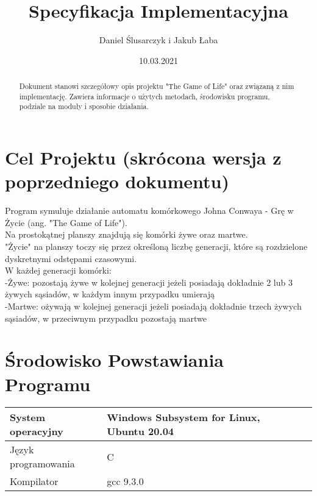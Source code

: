 \documentclass[11pt,a4paper]{report}
\title{\Huge Specyfikacja Implementacyjna}
\author{Daniel Ślusarczyk i Jakub Łaba}
\date{10.03.2021}
\begin{document}
\maketitle

\renewcommand*\thesection{\arabic{section}} 

\begin{abstract}
Dokument stanowi szczegółowy opis projektu "The Game of Life" oraz związaną z nim implementację. Zawiera informacje o użytych metodach, środowisku programu,
podziale na moduły i sposobie działania.
\end{abstract}

\pagestyle{fancy}
\fancyhf{}
\setcounter{page}{0}

{
\fancyhead{} 
\fancyfoot{} 
}
\thispagestyle{empty} 
\tableofcontents 
\thispagestyle{empty}
\newpage

{
\fancyhead{} 
\fancyfoot[C]{\thepage}
}

\section{Cel Projektu (skrócona wersja z poprzedniego dokumentu)}\label{sec:tekst}
Program symuluje działanie automatu komórkowego Johna Conwaya - Grę w Życie (ang. "The Game of Life").\\
Na prostokątnej planszy znajdują się komórki żywe oraz martwe.\\
"Życie" na planszy toczy się przez określoną liczbę generacji, które są rozdzielone dyskretnymi odstępami czasowymi.\\
W każdej generacji komórki:\\
	-Żywe: pozostają żywe w kolejnej generacji jeżeli posiadają dokładnie 2 lub 3 żywych sąsiadów, w każdym innym przypadku umierają\\
	-Martwe: ożywają w kolejnej generacji jeżeli posiadają dokładnie trzech żywych sąsiadów, w przeciwnym przypadku pozostają martwe\\


\section{Środowisko Powstawiania Programu}\label{sec:teskt}
\begin{tabularx}{\textwidth}{  X|Xl  }
\hline
			System operacyjny		&Windows Subsystem for Linux, Ubuntu 20.04\\
\hline
			Język programowania	&C\\
\hline
			Kompilator			&gcc 9.3.0\\
\end{tabularx}
\newpage
\end{document}
